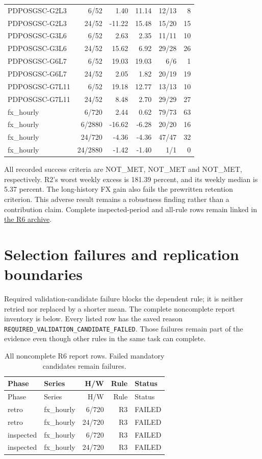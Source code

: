 \documentclass[11pt,a4paper]{article}
\begin{document}
\begin{longtable}{p{35mm}rrrrr}
PDPOSGSC-G2L3 & 6/52 & 1.40 & 11.14 & 12/13 & 8 \\
PDPOSGSC-G2L3 & 24/52 & -11.22 & 15.48 & 15/20 & 15 \\
PDPOSGSC-G3L6 & 6/52 & 2.63 & 2.35 & 11/11 & 10 \\
PDPOSGSC-G3L6 & 24/52 & 15.62 & 6.92 & 29/28 & 26 \\
PDPOSGSC-G6L7 & 6/52 & 19.03 & 19.03 & 6/6 & 1 \\
PDPOSGSC-G6L7 & 24/52 & 2.05 & 1.82 & 20/19 & 19 \\
PDPOSGSC-G7L11 & 6/52 & 19.18 & 12.77 & 13/13 & 10 \\
PDPOSGSC-G7L11 & 24/52 & 8.48 & 2.70 & 29/29 & 27 \\
fx\_hourly & 6/720 & 2.44 & 0.62 & 79/73 & 63 \\
fx\_hourly & 6/2880 & -16.62 & -6.28 & 20/20 & 16 \\
fx\_hourly & 24/720 & -4.36 & -4.36 & 47/47 & 32 \\
fx\_hourly & 24/2880 & -1.42 & -1.40 & 1/1 & 0 \\
\end{longtable}
\endgroup

All recorded success criteria are NOT\_MET,
NOT\_MET and NOT\_MET, respectively.
R2's worst weekly excess is 181.39 percent,
and its weekly median is 5.37 percent.
The long-history FX gain also fails the prewritten retention criterion.
This adverse result remains a robustness finding rather than a contribution
claim. Complete inspected-period and all-rule rows remain linked in
\href{https://github.com/ByronLi0207/financial-mathematics-paper-20261020/blob/revision-v7-final/results/supervisor-20261023/r6/README.md}{the R6 archive}.\section{Selection failures and replication boundaries}\label{sup:selection-failures}

Required validation-candidate failure blocks the dependent rule;
it is neither retried nor replaced by a shorter mean. The complete noncomplete
report inventory is below. Every listed row has the saved reason
\texttt{REQUIRED\_VALIDATION\_CANDIDATE\_FAILED}. Those failures remain part of
the evidence even though other rules in the same task can complete.
\begingroup
\small
\setlength{\tabcolsep}{3pt}
\renewcommand{\arraystretch}{1.12}
\begin{longtable}{lp{35mm}rrl}
\caption{All noncomplete R6 report rows. Failed mandatory candidates remain failures.}\\
\toprule
Phase & Series & H/W & Rule & Status \\
\midrule
\endfirsthead
\toprule
Phase & Series & H/W & Rule & Status \\
\midrule
\endhead
\bottomrule
\endfoot
retro & fx\_hourly & 6/720 & R3 & FAILED \\
retro & fx\_hourly & 24/720 & R3 & FAILED \\
inspected & fx\_hourly & 6/720 & R3 & FAILED \\
inspected & fx\_hourly & 24/720 & R3 & FAILED \\
\end{longtable}
\endgroup
\end{document}
